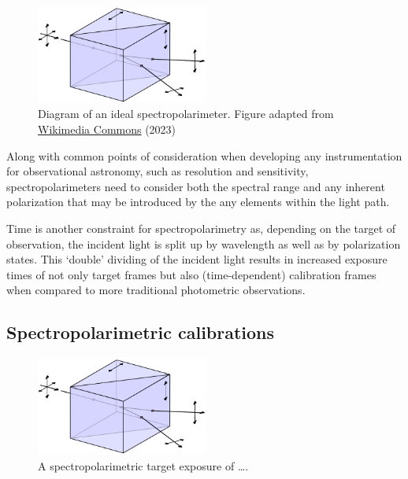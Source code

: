\begin{figure}[t]
    \centering
    \includegraphics[width=0.5\textwidth]{figures/2_wollaston.pdf}
    \caption{Diagram of an ideal spectropolarimeter. Figure adapted from \protect\href{https://commons.wikimedia.org/wiki/File:Wollaston-prism.svg}{Wikimedia Commons} (2023)}
    \label{fig:spectropolarimeter}
\end{figure}

Along with common points of consideration when developing any instrumentation for observational astronomy, such as resolution and sensitivity, spectropolarimeters need to consider both the spectral range and any inherent polarization that may be introduced by the any elements within the light path.
\prgph

Time is another constraint for spectropolarimetry as, depending on the target of observation, the incident light is split up by wavelength as well as by polarization states. This `double' dividing of the incident light results in increased exposure times of not only target frames but also (time-dependent) calibration frames when compared to more traditional photometric observations.


\subsection{Spectropolarimetric calibrations}

\begin{figure}[t]
    \centering
    \includegraphics[width=0.5\textwidth]{figures/2_wollaston.pdf}
    \caption{A spectropolarimetric target exposure of \dots.}
    \label{fig:specpol_exposure}
\end{figure}

